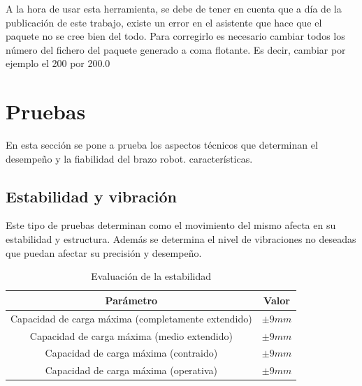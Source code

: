 A la hora de usar esta herramienta, se debe de tener en cuenta que a día de la publicación de este trabajo, existe un error en el asistente
que hace que el paquete no se cree bien del todo. Para corregirlo es necesario cambiar todos los número del fichero %
del paquete generado a coma flotante. Es decir, cambiar 
por ejemplo el 200 por 200.0

\section{Pruebas}
En esta sección se pone a prueba los aspectos técnicos que determinan el desempeño y la fiabilidad del brazo robot. 
características.

\subsection{Estabilidad y vibración}
Este tipo de pruebas determinan como el movimiento del mismo afecta en su estabilidad y estructura. Además se determina el nivel de 
vibraciones no deseadas que puedan afectar su precisión y desempeño.
\begin{table}[H]
\begin{center}
\begin{tabular}{|c|c|}
\hline
\textbf{Parámetro} & \textbf{Valor} \\
\hline
Capacidad de carga máxima (completamente extendido) & $\pm9mm$\\
Capacidad de carga máxima (medio extendido) & $\pm9mm$\\
Capacidad de carga máxima (contraido) & $\pm9mm$\\
Capacidad de carga máxima (operativa) & $\pm9mm$\\
\hline
\end{tabular}
\caption{Evaluación de la estabilidad}
\label{cuadro:evaluacion_estabilidad}
\end{center}
\end{table}


